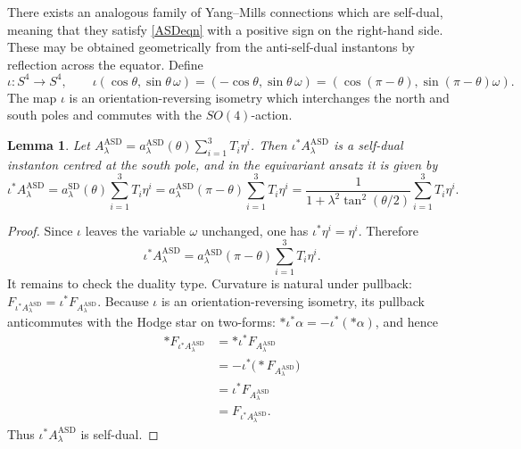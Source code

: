\documentclass[11pt,a4paper]{article}
\numberwithin{equation}{section}
\theoremstyle{plain}
\newtheorem{lemma}[theorem]{Lemma}
\theoremstyle{remark}
\begin{document}
There exists an analogous family of Yang--Mills connections which are
self-dual, meaning that they satisfy \eqref{ASDeqn} with a positive sign
on the right-hand side. These may be obtained geometrically from the
anti-self-dual instantons by reflection across the equator.
Define
$$
\iota:S^4\longrightarrow S^4,
\qquad
\iota(\cos\theta,\sin\theta\,\omega)
=
(-\cos\theta,\sin\theta\,\omega)
=
(\cos(\pi-\theta),\sin(\pi-\theta)\omega).
$$
The map $\iota$ is an orientation-reversing isometry which interchanges
the north and south poles and commutes with the $SO(4)$-action.

\begin{lemma}
Let $A^{\mathrm{ASD}}_\lambda
=
a^{\mathrm{ASD}}_\lambda(\theta)
\sum_{i=1}^3 T_i\eta^i$. Then $\iota^*A^{\mathrm{ASD}}_\lambda$ is a self-dual instanton centred
at the south pole, and in the equivariant ansatz it is given by
$$
\iota^*A^{\mathrm{ASD}}_\lambda
=
a^{\mathrm{SD}}_\lambda(\theta)
\sum_{i=1}^3T_i\eta^i =
a^{\mathrm{ASD}}_\lambda(\pi-\theta)\sum_{i=1}^3T_i\eta^i
=
\frac{1}{1+\lambda^2\tan^2(\theta/2)}\sum_{i=1}^3T_i\eta^i.
$$
\end{lemma}

\begin{proof}
Since $\iota$ leaves the variable $\omega$ unchanged, one has $\iota^*\eta^i=\eta^i$. Therefore
$$
\iota^*A^{\mathrm{ASD}}_\lambda
=
a^{\mathrm{ASD}}_\lambda(\pi-\theta)
\sum_{i=1}^3T_i\eta^i.
$$
It remains to check the duality type. Curvature is natural under
pullback: $F_{\iota^*A^{\mathrm{ASD}}_\lambda}
=
\iota^*F_{A^{\mathrm{ASD}}_\lambda}$. Because $\iota$ is an orientation-reversing isometry, its pullback
anticommutes with the Hodge star on two-forms: $*\iota^*\alpha=-\iota^*(*\alpha)$, and hence
\begin{align*}
*F_{\iota^*A^{\mathrm{ASD}}_\lambda}
&=
*\iota^*F_{A^{\mathrm{ASD}}_\lambda}\\
&=
-\iota^*\bigl(*F_{A^{\mathrm{ASD}}_\lambda}\bigr)\\
&=
\iota^*F_{A^{\mathrm{ASD}}_\lambda}\\
&=
F_{\iota^*A^{\mathrm{ASD}}_\lambda}.
\end{align*}
Thus $\iota^*A^{\mathrm{ASD}}_\lambda$ is self-dual. 
\end{proof}
\end{document}
